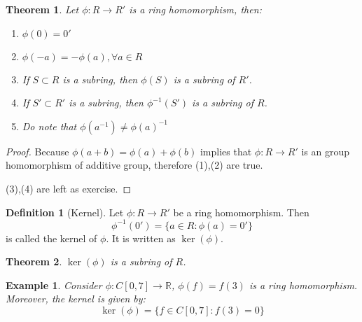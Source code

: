 \documentclass{article}
\theoremstyle{MyNonumberplain}
\theoremstyle{break}
\newtheorem*{proof}{Proof. }
\newcommand{\tmmathbf}[1]{\ensuremath{\boldsymbol{#1}}}
\theoremstyle{break}
\newtheorem{theorem}{Theorem}[section]
\newtheorem{example}{Example}[section]
\theoremstyle{break}
\theoremstyle{definition}
\theoremstyle{break}
\newtheorem{definition}{Definition}[section]
\begin{document}
\begin{thmbox}
    \begin{theorem}
        Let $\phi : R \rightarrow R'$ is a ring homomorphism, then:\bigskip
        \begin{enumerate}
          \item $\phi (0) = 0'$\bigskip
          
          \item $\phi (- a) = - \phi (a), \forall a \in R$\bigskip
          
          \item If $S \subset R$ is a subring, then $\phi (S)$ is a subring of $R'$.\bigskip
          
          \item If $S' \subset R'$ is a subring, then $\phi^{- 1} (S')$ is a subring
          of $R$.\bigskip
          
          \item Do note that $\phi (a^{- 1}) \tmmathbf{\neq} \phi (a)^{- 1}$
        \end{enumerate}
    \end{theorem}
    \begin{prfbox}
        \begin{proof}
            Because $\phi (a + b) = \phi (a) + \phi (b)$ implies that $\phi : R
            \rightarrow R'$ is an group homomorphism of additive group, therefore (1),(2)
            are true.\bigskip
            
            (3),(4) are left as exercise.
        \end{proof}
    \end{prfbox}
\end{thmbox}

\begin{defbox}
    \begin{definition}[Kernel]
        Let $\phi : R \rightarrow R'$ be a ring homomorphism. Then
        \[ \phi^{- 1} (0') = \{ a \in R : \phi (a) = 0' \} \]
        is called the kernel of $\phi$. It is written as $\ker (\phi)$.
    \end{definition}
\end{defbox}

\begin{thmbox}
    \begin{theorem}
        $\ker (\phi)$ is a subring of $R$. 
    \end{theorem}
\end{thmbox}

\begin{expbox}
    \begin{example}
        Consider $\phi : C [0, 7] \rightarrow \mathbb{R}$, $\phi (f) = f (3)$ is a
        ring homomorphism. Moreover, the kernel is given by:
        \[ \ker (\phi) = \{ f \in C [0, 7] : f (3) = 0 \} \]
    \end{example}
\end{expbox}
\end{document}
